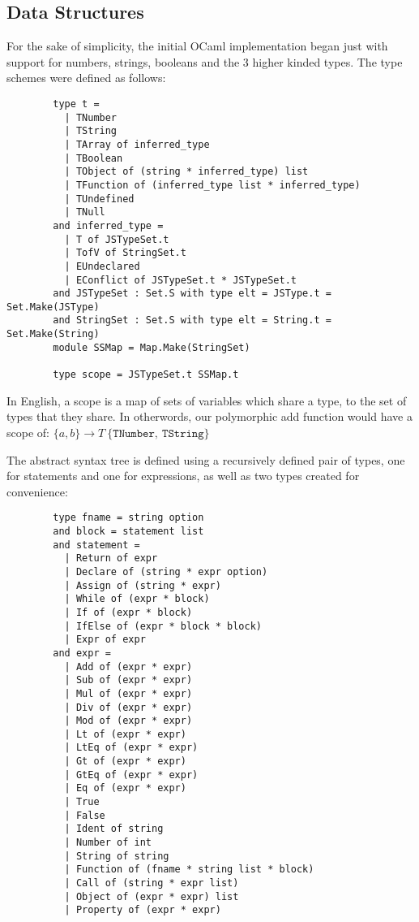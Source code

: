 \documentclass[british, twoside]{bhamthesis}
\theoremstyle{definition}
\begin{document}
    \subsection{Data Structures}
      For the sake of simplicity, the initial OCaml implementation began just with support for numbers, strings, booleans and the 3 higher kinded types. The type schemes were defined as follows:

      \begin{lstlisting}
        type t =
          | TNumber
          | TString
          | TArray of inferred_type
          | TBoolean
          | TObject of (string * inferred_type) list
          | TFunction of (inferred_type list * inferred_type)
          | TUndefined
          | TNull
        and inferred_type =
          | T of JSTypeSet.t
          | TofV of StringSet.t
          | EUndeclared
          | EConflict of JSTypeSet.t * JSTypeSet.t
        and JSTypeSet : Set.S with type elt = JSType.t = Set.Make(JSType)
        and StringSet : Set.S with type elt = String.t = Set.Make(String)
        module SSMap = Map.Make(StringSet)

        type scope = JSTypeSet.t SSMap.t
      \end{lstlisting}

      In English, a scope is a map of sets of variables which share a type, to the set of types that they share. In otherwords, our polymorphic add function would have a scope of:
      \begin{math}
        \{a, b\} \rightarrow T~\{\texttt{TNumber},~\texttt{TString}\}
      \end{math}

      The abstract syntax tree is defined using a recursively defined pair of types, one for statements and one for expressions, as well as two types created for convenience:

      \begin{lstlisting}
        type fname = string option
        and block = statement list
        and statement =
          | Return of expr
          | Declare of (string * expr option)
          | Assign of (string * expr)
          | While of (expr * block)
          | If of (expr * block)
          | IfElse of (expr * block * block)
          | Expr of expr
        and expr =
          | Add of (expr * expr)
          | Sub of (expr * expr)
          | Mul of (expr * expr)
          | Div of (expr * expr)
          | Mod of (expr * expr)
          | Lt of (expr * expr)
          | LtEq of (expr * expr)
          | Gt of (expr * expr)
          | GtEq of (expr * expr)
          | Eq of (expr * expr)
          | True
          | False
          | Ident of string
          | Number of int
          | String of string
          | Function of (fname * string list * block)
          | Call of (string * expr list)
          | Object of (expr * expr) list
          | Property of (expr * expr)
      \end{lstlisting}
\end{document}
